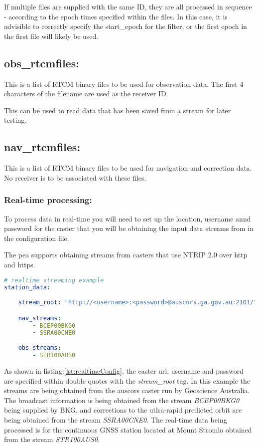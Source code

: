 If multiple files are supplied with the same ID, they are all processed in sequence - according to the epoch times specified within the files. In this case, it is advisible to correctly specify the start\_epoch for the filter, or the first epoch in the first file will likely be used.

\subsection*{obs\_rtcmfiles:}
This is a list of RTCM binary files to be used for observation data. The first 4 characters of the filename are used as the receiver ID.

This can be used to read data that has been saved from a stream for later testing.

\subsection*{nav\_rtcmfiles:}
This is a list of RTCM binary files to be used for navigation and correction data. No receiver is to be associated with these files.

\subsubsection{Real-time processing:}

To process data in real-time you will need to set up the location, username annd password for the caster that you will be obtaining the input data streams from in the configuration file.

The pea supports obtaining streams from casters that use NTRIP 2.0 over http and https.


\begin{lstlisting}[language=yaml,caption=station\_data:]
# realtime streaming example
station_data:
	
	stream_root: "http://<username>:<password>@auscors.ga.gov.au:2101/"

	nav_streams:
		- BCEP00BKG0
		- SSRA00CNE0
		
	obs_streams:
		- STR100AUS0
\end{lstlisting} \label{lst:realtimeConfig}

As shown in listing:\ref{lst:realtimeConfig}, the caster url, username and password are specified within double quotes with the \emph{stream\_root} tag. In this example the streams are being obtained from the auscors caster run by Geoscience Australia. 
The broadcast information is being obtained from the stream \emph{BCEP00BKG0} being supplied by BKG, and corrections to the utlra-rapid predicted orbit are being obtained from the stream \emph{SSRA00CNE0}. 
The real-time data being processed is for the continuous GNSS station located at Mount Stromlo obtained from the stream \emph{STR100AUS0}.

